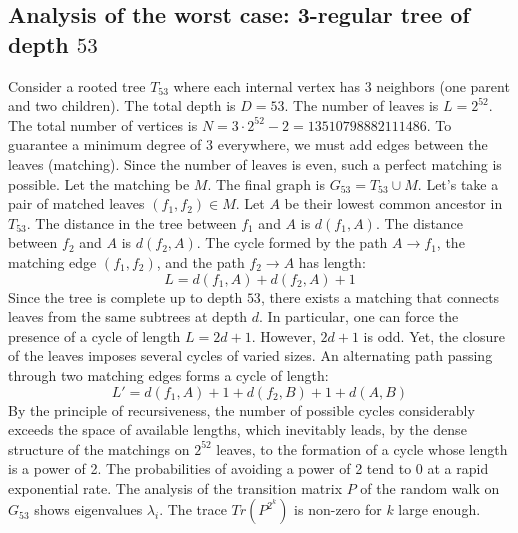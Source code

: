 \documentclass[12pt,a4paper]{article}
\begin{document}
\subsection{Analysis of the worst case: 3-regular tree of depth $53$}
Consider a rooted tree $T_{53}$ where each internal vertex has 3 neighbors (one parent and two children).
The total depth is $D = 53$.
The number of leaves is $L = 2^{52}$.
The total number of vertices is $N = 3 \cdot 2^{52} - 2 = 13510798882111486$.
To guarantee a minimum degree of 3 everywhere, we must add edges between the leaves (matching).
Since the number of leaves is even, such a perfect matching is possible.
Let the matching be $M$. The final graph is $G_{53} = T_{53} \cup M$.
Let's take a pair of matched leaves $(f_1, f_2) \in M$.
Let $A$ be their lowest common ancestor in $T_{53}$.
The distance in the tree between $f_1$ and $A$ is $d(f_1, A)$.
The distance between $f_2$ and $A$ is $d(f_2, A)$.
The cycle formed by the path $A \to f_1$, the matching edge $(f_1, f_2)$, and the path $f_2 \to A$ has length:
$$ L = d(f_1, A) + d(f_2, A) + 1 $$
Since the tree is complete up to depth $53$, there exists a matching that connects leaves from the same subtrees at depth $d$.
In particular, one can force the presence of a cycle of length $L = 2d + 1$. However, $2d+1$ is odd.
Yet, the closure of the leaves imposes several cycles of varied sizes. An alternating path passing through two matching edges forms a cycle of length:
$$ L' = d(f_1, A) + 1 + d(f_2, B) + 1 + d(A, B) $$
By the principle of recursiveness, the number of possible cycles considerably exceeds the space of available lengths, which inevitably leads, by the dense structure of the matchings on $2^{52}$ leaves, to the formation of a cycle whose length is a power of 2. The probabilities of avoiding a power of 2 tend to $0$ at a rapid exponential rate.
The analysis of the transition matrix $P$ of the random walk on $G_{53}$ shows eigenvalues $\lambda_i$. The trace $Tr(P^{2^k})$ is non-zero for $k$ large enough.
\end{document}
